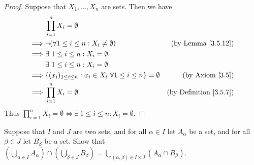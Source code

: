 \begin{proof}
    Suppose that \(X_1, \dots, X_n\) are sets.
    Then we have
    \begin{align*}
                 & \prod_{i = 1}^n X_i = \emptyset                                                                                      \\
        \implies & \lnot (\forall 1 \leq i \leq n : X_i \neq \emptyset)                            & \text{(by Lemma \ref{3.5.12})}     \\
        \implies & \exists\ 1 \leq i \leq n : X_i = \emptyset.                                                                          \\
                 & \exists\ 1 \leq i \leq n : X_i = \emptyset                                                                           \\
        \implies & \{(x_i)_{1 \leq i \leq n} : x_i \in X_i \ \forall 1 \leq i \leq n\} = \emptyset & \text{(by Axiom \ref{3.5})}        \\
        \implies & \prod_{i = 1}^n X_i = \emptyset.                                                & \text{(by Definition \ref{3.5.7})}
    \end{align*}
    Thus \(\prod_{i = 1}^n X_i = \emptyset \iff \exists\ 1 \leq i \leq n : X_i = \emptyset\).
\end{proof}

\begin{exercise}\label{ex 3.5.9}
    Suppose that \(I\) and \(J\) are two sets, and for all \(\alpha \in I\) let \(A_{\alpha}\) be a set, and for all \(\beta \in J\) let \(B_{\beta}\) be a set.
    Show that \((\bigcup_{\alpha \in I} A_{\alpha}) \cap (\bigcup_{\beta \in J} B_{\beta}) = \bigcup_{(\alpha, \beta) \in I \times J} (A_{\alpha} \cap B_{\beta})\).
\end{exercise}

